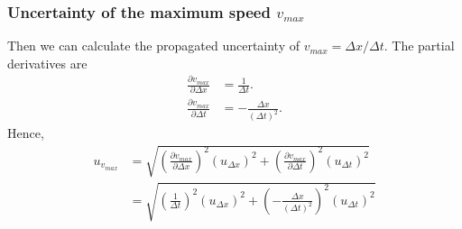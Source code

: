 \subsubsection{Uncertainty of the maximum speed $v_{max}$}
    Then we can calculate the propagated uncertainty of $v_{max}=\Delta x/\Delta t$. The partial derivatives are
    \[
    \begin{split}
        \frac{\partial v_{max}}{\partial \Delta x}&=\frac{1}{\Delta t}.\\[0.5cm]
        \frac{\partial v_{max}}{\partial \Delta t}&=-\frac{\Delta x}{(\Delta t)^2}.    
    \end{split}    
    \]
    Hence,
    \[
    \begin{split}
        u_{v_{max}}&=\sqrt{(\frac{\partial v_{max}}{\partial \Delta x})^2(u_{\Delta x})^2+(\frac{\partial v_{max}}{\partial \Delta t})^2(u_{\Delta t})^2}\\[0.4cm]
        &=\sqrt{(\frac{1}{\Delta t})^2(u_{\Delta x})^2+(-\frac{\Delta x}{(\Delta t)^2})^2(u_{\Delta t})^2}
    \end{split}
    \]

